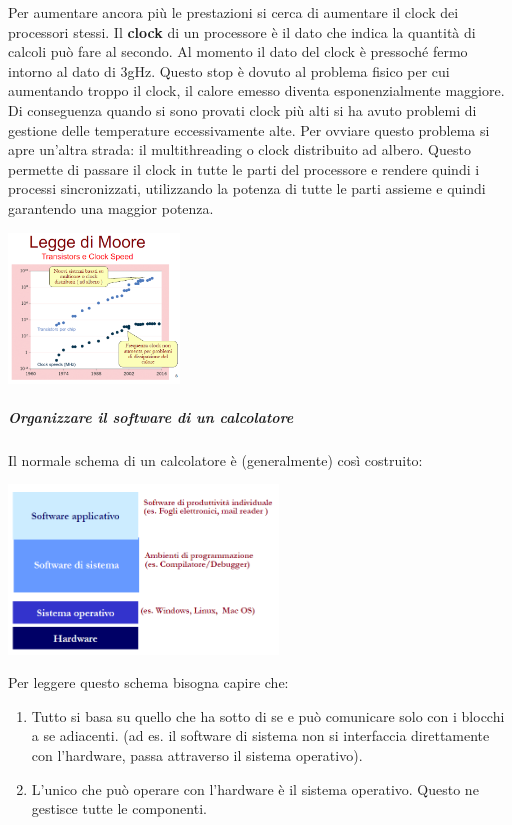 \documentclass[
  paper=a4,
  oneside  ,captions=tableheading
]{scrbook}
\providecommand{\tightlist}{%
  \setlength{\itemsep}{0pt}\setlength{\parskip}{0pt}}
\begin{document}
Per aumentare ancora più le prestazioni si cerca di aumentare il clock
dei processori stessi. Il \textbf{clock} di un processore è il dato che
indica la quantità di calcoli può fare al secondo. Al momento il dato
del clock è pressoché fermo intorno al dato di 3gHz. Questo stop è
dovuto al problema fisico per cui aumentando troppo il clock, il calore
emesso diventa esponenzialmente maggiore. Di conseguenza quando si sono
provati clock più alti si ha avuto problemi di gestione delle
temperature eccessivamente alte. Per ovviare questo problema si apre
un'altra strada: il multithreading o clock distribuito ad albero. Questo
permette di passare il clock in tutte le parti del processore e rendere
quindi i processi sincronizzati, utilizzando la potenza di tutte le
parti assieme e quindi garantendo una maggior potenza.

\includegraphics[height=4cm]{./image/image-20201111171947392.png}

\hypertarget{organizzare-il-software-di-un-calcolatore}{%
\subparagraph{Organizzare il software di un
calcolatore}\label{organizzare-il-software-di-un-calcolatore}}

Il normale schema di un calcolatore è (generalmente) così costruito:

\includegraphics[height=4.5cm]{./image/image-20201111172243268.png}

Per leggere questo schema bisogna capire che:

\begin{enumerate}
\def\labelenumi{\arabic{enumi}.}
\tightlist
\item
  Tutto si basa su quello che ha sotto di se e può comunicare solo con i
  blocchi a se adiacenti. (ad es. il software di sistema non si
  interfaccia direttamente con l'hardware, passa attraverso il sistema
  operativo).
\item
  L'unico che può operare con l'hardware è il sistema operativo. Questo
  ne gestisce tutte le componenti.
\end{enumerate}
\end{document}
